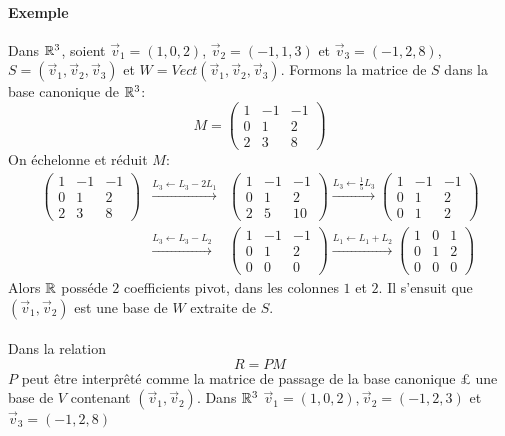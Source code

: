 \paragraph{Exemple} Dans $\mathbb{R}^3$, soient $\vec{v}_1 = (1, 0, 2)$, $\vec{v}_2 = (-1, 1, 3)$ et $\vec{v}_3 = (-1, 2, 8)$, $S = (\vec{v}_1, \vec{v}_2, \vec{v}_3)$ et $W = Vect(\vec{v}_1, \vec{v}_2, \vec{v}_3)$. Formons la matrice de $S$ dans la base canonique de $\mathbb{R}^3$:
$$M = \begin{pmatrix}
  1 & -1 & -1 \\
  0 & 1 & 2 \\
  2 & 3 & 8
\end{pmatrix}$$
On échelonne et réduit $M$:
\begin{eqnarray*}
  \begin{pmatrix}
    1 & -1 & -1 \\
    0 & 1 & 2 \\
    2 & 3 & 8
  \end{pmatrix}
  &\xrightarrow{L_3 \leftarrow L_3 - 2 L_1}&
  \begin{pmatrix}
    1 & -1 & -1 \\
    0 & 1 & 2 \\
    2 & 5 & 10
  \end{pmatrix}
  \xrightarrow{L_3 \leftarrow \frac{1}{5} L_3}
  \begin{pmatrix}
    1 & -1 & -1 \\
    0 & 1 & 2 \\
    0 & 1 & 2
  \end{pmatrix}
  \\
  &\xrightarrow{L_3 \leftarrow L_3 - L_2}&
  \begin{pmatrix}
    1 & -1 & -1 \\
    0 & 1 & 2 \\
    0 & 0 & 0
  \end{pmatrix}
  \xrightarrow{L_1 \leftarrow L_1 + L_2}
  \begin{pmatrix}
    1 & 0 & 1 \\
    0 & 1 & 2 \\
    0 & 0 & 0
  \end{pmatrix}
\end{eqnarray*}
Alors $\mathbb{R}$ posséde $2$ coefficients pivot, dans les colonnes $1$ et $2$. Il s'ensuit que $(\vec{v}_1, \vec{v}_2)$ est une base de $W$ extraite de $S$. 
\\\\
Dans la relation
$$R = P M$$
$P$ peut être interprêté comme la matrice de passage de la base canonique £ une base de $V$ contenant $(\vec{v}_1, \vec{v}_2)$. Dans $\mathbb{R}^3$ $\vec{v}_1 = (1, 0, 2), \vec{v}_2 = (-1, 2, 3)$ et $\vec{v}_3 = (-1, 2, 8)$
